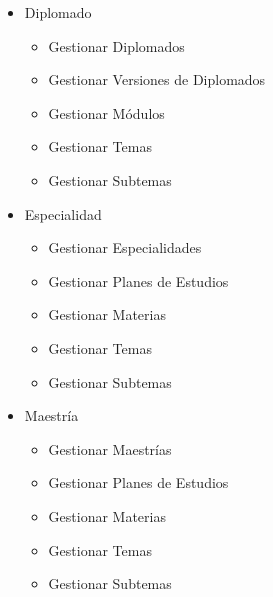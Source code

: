 			\begin{itemize}
				\item Diplomado
					\begin{itemize}
						\item Gestionar Diplomados
						\item Gestionar Versiones de Diplomados
						\item Gestionar Módulos
						\item Gestionar Temas
						\item Gestionar Subtemas
					\end{itemize}
				\item Especialidad
				\begin{itemize}
					\item Gestionar Especialidades
					\item Gestionar Planes de Estudios
					\item Gestionar Materias
					\item Gestionar Temas
					\item Gestionar Subtemas
				\end{itemize}
				\item Maestría
				\begin{itemize}
				\item Gestionar Maestrías
				\item Gestionar Planes de Estudios
				\item Gestionar Materias
				\item Gestionar Temas
				\item Gestionar Subtemas
			\end{itemize}
			\end{itemize}
